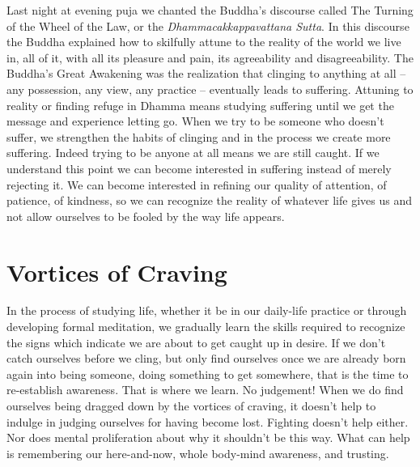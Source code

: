 Last night at evening puja we chanted the Buddha’s discourse called
The Turning of the Wheel of the Law, or the \emph{Dhammacakkappavattana
Sutta}. In this discourse the Buddha explained how to skilfully attune
to the reality of the world we live in, all of it, with all its pleasure
and pain, its agreeability and disagreeability. The Buddha’s Great
Awakening was the realization that clinging to anything at all – any
possession, any view, any practice – eventually leads to suffering.
Attuning to reality or finding refuge in Dhamma means studying suffering
until we get the message and experience letting go. When we try to be
someone who doesn’t suffer, we strengthen the habits of clinging and in
the process we create more suffering. Indeed trying to be anyone at all
means we are still caught. If we understand this point we can become
interested in suffering instead of merely rejecting it. We can become
interested in refining our quality of attention, of patience, of
kindness, so we can recognize the reality of whatever life gives us and
not allow ourselves to be fooled by the way life appears.

\section{Vortices of Craving}

In the process of studying life, whether it be in our daily-life
practice or through developing formal meditation, we gradually learn the
skills required to recognize the signs which indicate we are about to
get caught up in desire. If we don’t catch ourselves before we cling,
but only find ourselves once we are already born again into being
someone, doing something to get somewhere, that is the time to
re-establish awareness. That is where we learn. No judgement! When we do
find ourselves being dragged down by the vortices of craving, it doesn’t
help to indulge in judging ourselves for having become lost. Fighting
doesn’t help either. Nor does mental proliferation about why it
shouldn’t be this way. What can help is remembering our here-and-now,
whole body-mind awareness, and trusting.

